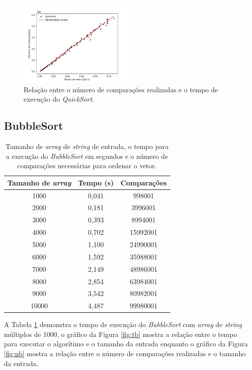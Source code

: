 \documentclass[12pt,a4paper,oneside]{article}
\begin{document}
\begin{figure}[H]
\label{fig:ntq}
\begin{center}
    \includegraphics[width=0.5\textwidth]{FigTNQ.png} 
\end{center}
\caption{Relação entre o número de comparações realizadas e o tempo de execução do \textit{QuickSort}.}
\label{fig:ntq}
\end{figure}

\subsection{BubbleSort}

\begin{table}[H]
\caption{Tamanho de \textit{array} de \textit{string} de entrada, o tempo para a execução do \textit{BubbleSort} em segundos e o número de comparações necessárias para ordenar o vetor.}
\label{tab:db}
\begin{center}
\begin{tabular}{|c c c|}
\hline
Tamanho de \textit{array}	& Tempo (s)	& Comparações 	\\
\hline
1000 & 0,041 & 998001\\
2000 & 0,181 & 3996001\\
3000 & 0,393 & 8994001\\
4000 & 0,702 & 15992001\\
5000 & 1,100 & 24990001\\
6000 & 1,592 & 35988001\\
7000 & 2,149 & 48986001\\
8000 & 2,854 & 63984001\\
9000 & 3,542 & 80982001\\
10000 & 4,487 & 99980001\\
\hline
\end{tabular}
\end{center}
\end{table}

\quad A Tabela \ref{tab:db} demonstra o tempo de execução do \textit{BubbleSort} com \textit{array} de \textit{string} múltiplos de 1000, o gráfico da Figura \ref{fig:tb} mostra a relação entre o tempo para executar o algorítimo e o tamanho da entrada enquanto o gráfico da Figura \ref{fig:nb} mostra a relação entre o número de comparações realizadas e o tamanho da entrada.
\end{document}
